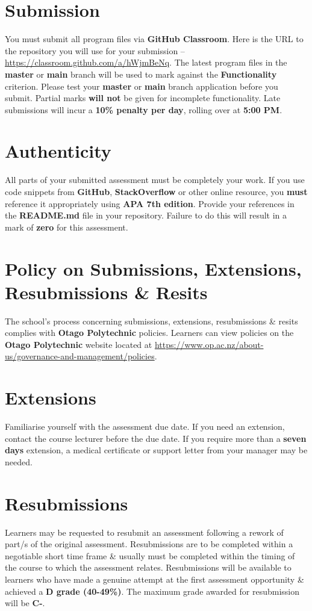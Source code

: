 \documentclass{article}
\begin{document}
\section*{Submission}
You must submit all program files via \textbf{GitHub Classroom}. Here is the URL to the repository you will use for your submission – \href{https://classroom.github.com/a/hWjmBeNq}{https://classroom.github.com/a/hWjmBeNq}. The latest program files in the \textbf{master} or \textbf{main} branch will be used to mark against the \textbf{Functionality} criterion. Please test your \textbf{master} or \textbf{main} branch application before you submit. Partial marks \textbf{will not} be given for incomplete functionality. Late submissions will incur a \textbf{10\% penalty per day}, rolling over at \textbf{5:00 PM}.

\section*{Authenticity}
All parts of your submitted assessment must be completely your work. If you use code snippets from \textbf{GitHub}, \textbf{StackOverflow} or other online resource, you \textbf{must} reference it appropriately using \textbf{APA 7th edition}. Provide your references in the \textbf{README.md} file in your repository. Failure to do this will result in a mark of \textbf{zero} for this assessment.

\section*{Policy on Submissions, Extensions, Resubmissions \& Resits}
The school's process concerning submissions, extensions, resubmissions \& resits complies with \textbf{Otago Polytechnic} policies. Learners can view policies on the \textbf{Otago Polytechnic} website located at \href{https://www.op.ac.nz/about-us/governance-and-management/policies}{https://www.op.ac.nz/about-us/governance-and-management/policies}.

\section*{Extensions}
Familiarise yourself with the assessment due date. If you need an extension, contact the course lecturer before the due date. If you require more than a \textbf{seven days} extension, a medical certificate or support letter from your manager may be needed.

\section*{Resubmissions}
Learners may be requested to resubmit an assessment following a rework of part/s of the original assessment. Resubmissions are to be completed within a negotiable short time frame \& usually must be completed within the timing of the course to which the assessment relates. Resubmissions will be available to learners who have made a genuine attempt at the first assessment opportunity \& achieved a \textbf{D grade (40-49\%)}. The maximum grade awarded for resubmission will be \textbf{C-}.
\end{document}
